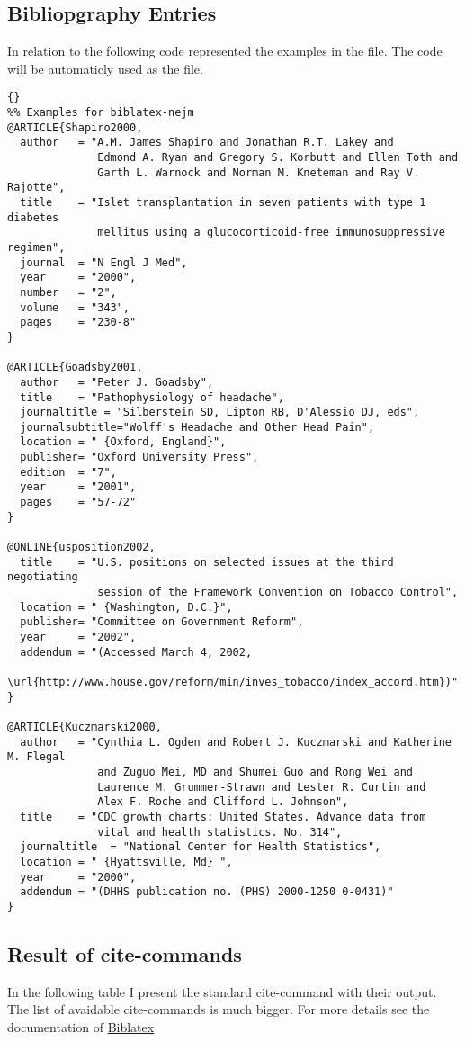 \documentclass[english]{ltxdockit}[2011/03/25]
\newcommand*{\biblatex}{Biblatex\xspace}
\newcommand*{\biblatexctan}{http://www.ctan.org/tex-archive/macros/latex/contrib/biblatex/}
\begin{document}
\subsection{Bibliopgraphy Entries}
In relation to  the following code represented the examples in the  file. The code will be automaticly used as the  file.
\begin{lstlisting}[style=bibtex]{}
%% Examples for biblatex-nejm
@ARTICLE{Shapiro2000,
  author   = "A.M. James Shapiro and Jonathan R.T. Lakey and
              Edmond A. Ryan and Gregory S. Korbutt and Ellen Toth and
              Garth L. Warnock and Norman M. Kneteman and Ray V. Rajotte",
  title    = "Islet transplantation in seven patients with type 1 diabetes
              mellitus using a glucocorticoid-free immunosuppressive regimen",
  journal  = "N Engl J Med",
  year     = "2000",
  number   = "2",
  volume   = "343",
  pages    = "230-8"
}

@ARTICLE{Goadsby2001,
  author   = "Peter J. Goadsby",
  title    = "Pathophysiology of headache",
  journaltitle = "Silberstein SD, Lipton RB, D'Alessio DJ, eds",
  journalsubtitle="Wolff's Headache and Other Head Pain",
  location = " {Oxford, England}",
  publisher= "Oxford University Press",
  edition  = "7",
  year     = "2001",
  pages    = "57-72"
}

@ONLINE{usposition2002,
  title    = "U.S. positions on selected issues at the third negotiating
              session of the Framework Convention on Tobacco Control",
  location = " {Washington, D.C.}",
  publisher= "Committee on Government Reform",
  year     = "2002",
  addendum = "(Accessed March 4, 2002,
               \url{http://www.house.gov/reform/min/inves_tobacco/index_accord.htm})"
}

@ARTICLE{Kuczmarski2000,
  author   = "Cynthia L. Ogden and Robert J. Kuczmarski and Katherine M. Flegal
              and Zuguo Mei, MD and Shumei Guo and Rong Wei and
              Laurence M. Grummer-Strawn and Lester R. Curtin and
              Alex F. Roche and Clifford L. Johnson",
  title    = "CDC growth charts: United States. Advance data from
              vital and health statistics. No. 314",
  journaltitle  = "National Center for Health Statistics",
  location = " {Hyattsville, Md} ",
  year     = "2000",
  addendum = "(DHHS publication no. (PHS) 2000-1250 0-0431)"
}
\end{lstlisting}
\clearpage
\subsection{Result of cite-commands}
In the following table I present the standard cite-command with their output. The list of avaidable cite-commands is much bigger. For more details see the documentation of \href{\biblatexctan}{\biblatex}
\end{document}
